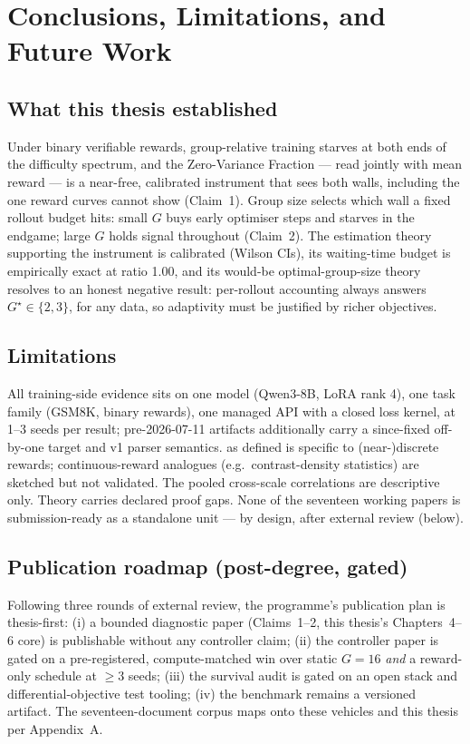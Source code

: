\chapter{Conclusions, Limitations, and Future Work}
\label{ch:conclusion}

\section{What this thesis established}
Under binary verifiable rewards, group-relative training starves at both ends
of the difficulty spectrum, and the Zero-Variance Fraction --- read jointly
with mean reward --- is a near-free, calibrated instrument that sees both
walls, including the one reward curves cannot show (Claim~1). Group size
selects which wall a fixed rollout budget hits: small $G$ buys early optimiser
steps and starves in the endgame; large $G$ holds signal throughout
(Claim~2). The estimation theory supporting the instrument is calibrated
(Wilson CIs), its waiting-time budget is empirically exact at ratio 1.00, and
its would-be optimal-group-size theory resolves to an honest negative result:
per-rollout accounting always answers $G^\star\in\{2,3\}$, for any data, so
adaptivity must be justified by richer objectives.

\section{Limitations}
All training-side evidence sits on one model (Qwen3-8B, LoRA rank 4), one
task family (GSM8K, binary rewards), one managed API with a closed loss
kernel, at 1--3 seeds per result; pre-2026-07-11 artifacts additionally carry
a since-fixed off-by-one target and v1 parser semantics. \ZVF{} as defined is
specific to (near-)discrete rewards; continuous-reward analogues (e.g.\
contrast-density statistics) are sketched but not validated. The pooled
cross-scale correlations are descriptive only. Theory carries declared proof
gaps. None of the seventeen working papers is submission-ready as a standalone
unit --- by design, after external review (below).

\section{Publication roadmap (post-degree, gated)}
Following three rounds of external review, the programme's publication plan
is thesis-first: (i) a bounded diagnostic paper (Claims~1--2, this thesis's
Chapters~4--6 core) is publishable without any controller claim; (ii) the
controller paper is gated on a pre-registered, compute-matched win over
static $G{=}16$ \emph{and} a reward-only schedule at $\ge3$ seeds;
(iii) the survival audit is gated on an open stack and differential-objective
test tooling; (iv) the benchmark remains a versioned artifact. The
seventeen-document corpus maps onto these vehicles and this thesis per
Appendix~A.

